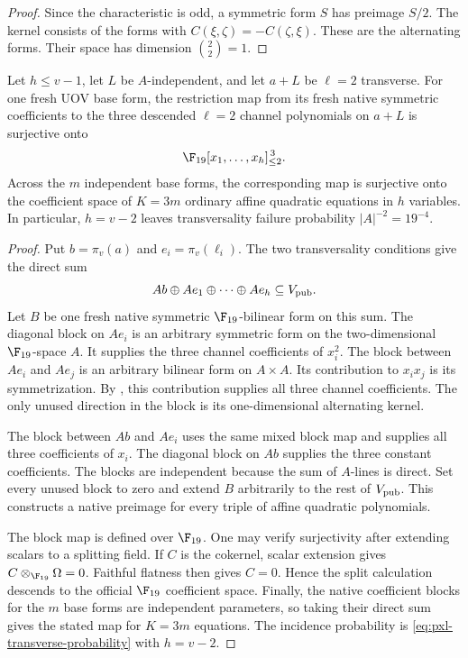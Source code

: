 \begin{proof}
Since the characteristic is odd, a symmetric form $S$ has preimage $S/2$.
The kernel consists of the forms with
$C(\xi,\zeta)=-C(\zeta,\xi)$.  These are the alternating forms.  Their
space has dimension $\binom{2}{2}=1$.
\end{proof}

\begin{proposition}[$\ell=2$ affine coefficient support]
\label{prop:pxl-l2-affine-support}
Let $h\le v-1$, let $L$ be $A$-independent, and let $a+L$ be $\ell=2$
transverse.  For one fresh UOV base form, the restriction map from its fresh
native symmetric coefficients to the three descended $\ell=2$ channel
polynomials on $a+L$ is surjective onto
\begin{equation}
 \F_{19}[x_1,\ldots,x_h]_{\le2}^{\,3}.
 \label{eq:pxl-l2-affine-surjection}
\end{equation}
Across the $m$ independent base forms, the corresponding map is surjective
onto the coefficient space of $K=3m$ ordinary affine quadratic equations in
$h$ variables.  In particular, $h=v-2$ leaves transversality failure
probability $|A|^{-2}=19^{-4}$.
\end{proposition}

\begin{proof}
Put $b=\pi_v(a)$ and $e_i=\pi_v(\ell_i)$.  The two transversality conditions
give the direct sum
\[
 Ab\oplus Ae_1\oplus\cdots\oplus Ae_h\subseteq V_{\rm pub}.
\]
Let $B$ be one fresh native symmetric $\F_{19}$-bilinear form on this sum.
The diagonal block on $Ae_i$ is an arbitrary symmetric form on the
two-dimensional $\F_{19}$-space $A$.  It supplies the three channel
coefficients of $x_i^2$.  The block between $Ae_i$ and $Ae_j$ is an
arbitrary bilinear form on $A\times A$.  Its contribution to $x_ix_j$ is its
symmetrization.  By , this contribution supplies
all three channel coefficients.  The only unused direction in the block is
its one-dimensional alternating kernel.

The block between $Ab$ and $Ae_i$ uses the same mixed block map and supplies
all three coefficients of $x_i$.  The diagonal block on $Ab$ supplies the
three constant coefficients.  The blocks are independent because the sum of
$A$-lines is direct.  Set every unused block to zero and extend $B$
arbitrarily to the rest of $V_{\rm pub}$.  This constructs a native preimage
for every triple of affine quadratic polynomials.

The block map is defined over $\F_{19}$.  One may verify surjectivity after
extending scalars to a splitting field.  If $C$ is the cokernel, scalar
extension gives $C\otimes_{\F_{19}}\Omega=0$.  Faithful flatness then gives
$C=0$.  Hence the split calculation descends to the official
$\F_{19}$ coefficient space.  Finally, the native coefficient blocks for
the $m$ base forms are independent parameters, so taking their direct sum
gives the stated map for $K=3m$ equations.  The incidence probability is
\eqref{eq:pxl-transverse-probability} with $h=v-2$.
\end{proof}

